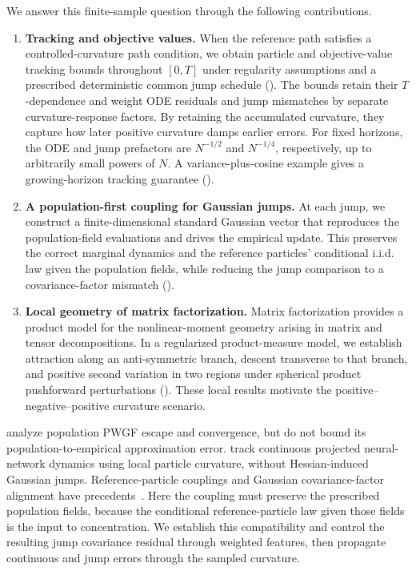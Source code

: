 We answer this finite-sample question through the following contributions.

\begin{enumerate}[leftmargin=1.35em,label=\arabic*.,itemsep=0.01em,topsep=0.05pt,parsep=5pt]
    \item \textbf{Tracking and objective values.}
    When the reference path satisfies a controlled-curvature path condition,
    we obtain particle and objective-value tracking bounds throughout \([0,T]\)
    under regularity assumptions and a prescribed deterministic common jump schedule
    ().
    The bounds retain their \(T\)-dependence and weight ODE residuals and jump
    mismatches by separate curvature-response factors. By retaining the
    accumulated curvature, they capture how later positive curvature damps
    earlier errors. For fixed horizons, the ODE and jump prefactors are
    \(N^{-1/2}\) and \(N^{-1/4}\), respectively, up to arbitrarily small powers of \(N\).
    A variance-plus-cosine example gives a growing-horizon tracking guarantee
    ().

    \item \textbf{A population-first coupling for Gaussian jumps.}
    At each jump, we construct a finite-dimensional standard Gaussian vector that
    reproduces the population-field evaluations and drives the empirical update.
    This preserves the correct marginal dynamics and the reference particles'
    conditional i.i.d. law given the population fields, while reducing the jump
    comparison to a covariance-factor mismatch
    ().

    \item \textbf{Local geometry of matrix factorization.}
    Matrix factorization provides a product model for the nonlinear-moment
    geometry arising in matrix and tensor decompositions. In a regularized
    product-measure model, we establish attraction along an anti-symmetric
    branch, descent transverse to that branch, and positive second variation
    in two regions under spherical product pushforward perturbations
    (). These local results motivate the
    positive--negative--positive curvature scenario.
\end{enumerate}

\citet{yamamoto2025hessianguided} analyze population PWGF escape and convergence,
but do not bound its population-to-empirical approximation error.
\citet{glasgow2025meanfield} track continuous projected neural-network dynamics
using local particle curvature, without Hessian-induced Gaussian jumps.
Reference-particle couplings and Gaussian covariance-factor alignment have
precedents~\citep{sznitman1991,masarotto2019procrustes}. Here the coupling must
preserve the prescribed population fields, because the conditional
reference-particle law given those fields is the input to concentration.
We establish this compatibility and control the resulting jump covariance
residual through weighted features, then propagate continuous and jump errors
through the sampled curvature.

